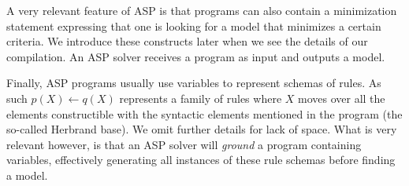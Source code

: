 A very relevant feature of ASP is that programs can also contain a minimization statement expressing that one is looking for a model that minimizes a certain criteria. We introduce these constructs later when we see the details of our compilation. An ASP solver receives a program as input and outputs a model.

Finally, ASP programs usually use variables to represent schemas of rules. As such $p(X)\leftarrow q(X)$ represents a family of rules where $X$ moves over all the elements constructible with the syntactic elements mentioned in the program (the so-called Herbrand base). We omit further details for lack of space. What is very relevant however, is that an ASP solver will \emph{ground} a program containing variables, effectively generating all instances of these rule schemas before finding a model.